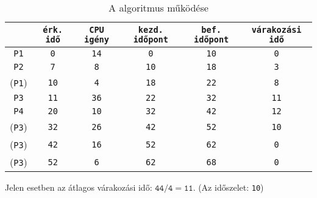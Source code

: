 \documentclass[../main.tex]{subfiles}
\begin{document}
\begin{table}[H]
	\centering
	\begin{tabular}{|c|c|c|c|c|c|}
		\hline
		              & \texttt{érk. idő} & \texttt{CPU igény} & \texttt{kezd. időpont} & \texttt{bef. időpont} & \texttt{várakozási idő}
		\\ \hline
		\texttt{P1}   & \texttt{0}        & \texttt{14}        & \texttt{0}             & \texttt{10}           & \texttt{0}              \\
		\texttt{P2}   & \texttt{7}        & \texttt{8}         & \texttt{10}            & \texttt{18}           & \texttt{3}              \\
		(\texttt{P1}) & \texttt{10}       & \texttt{4}         & \texttt{18}            & \texttt{22}           & \texttt{8}              \\
		\texttt{P3}   & \texttt{11}       & \texttt{36}        & \texttt{22}            & \texttt{32}           & \texttt{11}             \\
		\texttt{P4}   & \texttt{20}       & \texttt{10}        & \texttt{32}            & \texttt{42}           & \texttt{12}             \\
		(\texttt{P3}) & \texttt{32}       & \texttt{26}        & \texttt{42}            & \texttt{52}           & \texttt{10}             \\
		(\texttt{P3}) & \texttt{42}       & \texttt{16}        & \texttt{52}            & \texttt{62}           & \texttt{0}              \\
		(\texttt{P3}) & \texttt{52}       & \texttt{6}         & \texttt{62}            & \texttt{68}           & \texttt{0}              \\
		\hline
	\end{tabular}
	\caption{A  algoritmus működése}
	\label{table:rr}
\end{table}

Jelen esetben az átlagos várakozási idő:
$\mathtt{44/4 = 11}$. (Az időszelet: \texttt{10})
\end{document}
